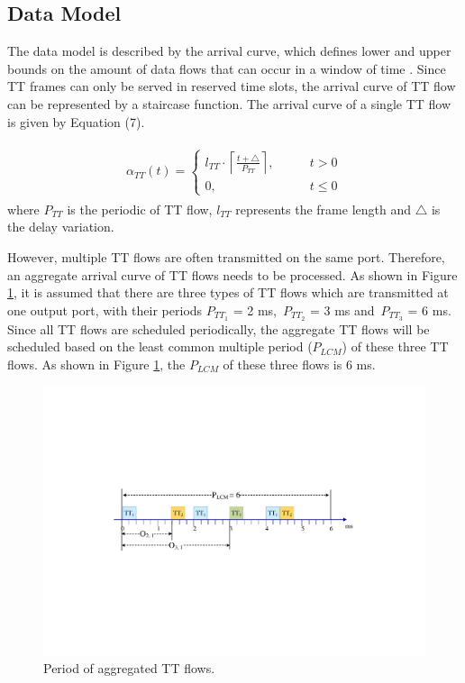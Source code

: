 \documentclass[electronics,article,accept,moreauthors,pdftex]{Definitions/mdpi}
\begin{document}
\subsection{Data Model}

The data model is described by the arrival curve, which defines lower and upper bounds on the amount of data flows that can occur in a window of time \cite{le1998application}. Since TT frames can only be served in reserved time slots, the arrival curve of TT flow can be represented by a staircase function. The arrival curve of a single TT flow is given by Equation (7).

\begin{gather}
\begin{align}
	\alpha_{TT}(t)=\begin{cases}
	l_{TT}\cdot \left \lceil \frac{t+\triangle}{P_{TT}} \right \rceil,
	\qquad & t>0 \\
	0, \qquad & t\le0
\end{cases}
\end{align}
\end{gather}
where $P_{TT}$ is the periodic of TT flow, $l_{TT}$ represents the frame length and $\triangle$ is the delay variation.

However, multiple TT flows are often transmitted on the same port. Therefore, an aggregate arrival curve of TT flows needs to be processed. As shown in {Figure} \ref{lcm}, it is assumed that there are three types of TT flows which are transmitted at one output port, with their periods $P_{TT_1}$ = 2 ms,\  $P_{TT_2}$ = 3 ms and\  $P_{TT_3}$ = 6 ms. Since all TT flows are scheduled periodically, the aggregate TT flows will be scheduled based on the least common multiple period ($P_{LCM}$) of these three TT flows. As shown in {Figure} \ref{lcm}, the $P_{LCM}$ of these three flows is 6 ms.

\begin{figure}[H]
\centering
\includegraphics[scale=0.52] {figures/LCM}
\caption{Period of aggregated TT flows.}
\label{lcm}
\end{figure}
\end{document}
